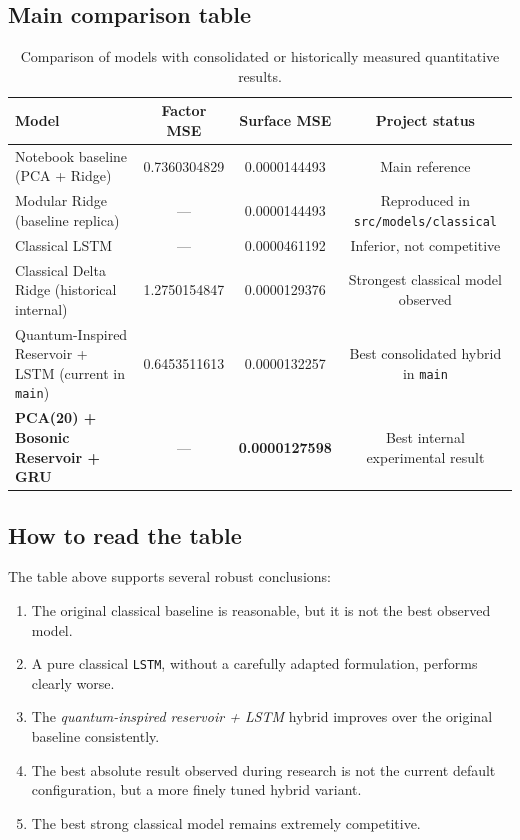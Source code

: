 \documentclass[11pt,a4paper]{article}
\newcommand{\best}[1]{\textbf{#1}}
\begin{document}
\subsection{Main comparison table}

\begin{table}[H]
\centering
\caption{Comparison of models with consolidated or historically measured quantitative results.}
\begin{tabularx}{\textwidth}{Y c c c}
\toprule
\textbf{Model} & \textbf{Factor MSE} & \textbf{Surface MSE} & \textbf{Project status} \\
\midrule
Notebook baseline (PCA + Ridge) & 0.7360304829 & 0.0000144493 & Main reference \\
Modular Ridge (baseline replica) & --- & 0.0000144493 & Reproduced in \texttt{src/models/classical} \\
Classical LSTM & --- & 0.0000461192 & Inferior, not competitive \\
Classical Delta Ridge (historical internal) & 1.2750154847 & 0.0000129376 & Strongest classical model observed \\
Quantum-Inspired Reservoir + LSTM (current in \texttt{main}) & 0.6453511613 & 0.0000132257 & Best consolidated hybrid in \texttt{main} \\
\best{PCA(20) + Bosonic Reservoir + GRU} & --- & \best{0.0000127598} & Best internal experimental result \\
\bottomrule
\end{tabularx}
\end{table}

\subsection{How to read the table}
The table above supports several robust conclusions:

\begin{enumerate}[label=\arabic*.]
    \item The original classical baseline is reasonable, but it is not the best observed model.
    \item A pure classical \texttt{LSTM}, without a carefully adapted formulation, performs clearly worse.
    \item The \textit{quantum-inspired reservoir + LSTM} hybrid improves over the original baseline consistently.
    \item The best absolute result observed during research is not the current default configuration, but a more finely tuned hybrid variant.
    \item The best strong classical model remains extremely competitive.
\end{enumerate}
\end{document}
